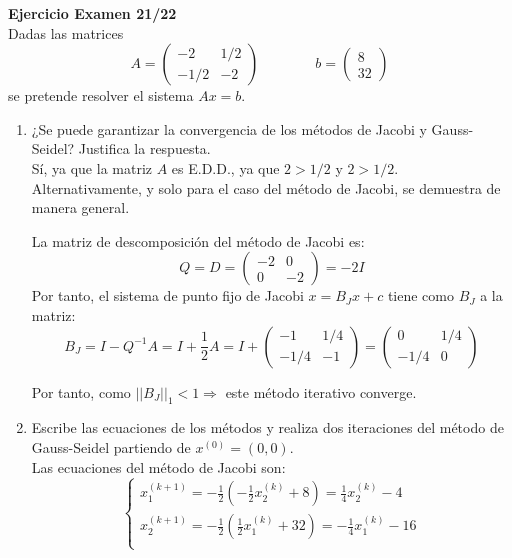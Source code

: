 \begin{ejercicio} \textbf{Ejercicio Examen 21/22}\\
    Dadas las matrices
    $$A=\left( \begin{array}{cc}
        -2 & 1/2 \\
        -1/2 & -2
    \end{array}\right)
    \qquad \qquad
    b=\left( \begin{array}{c}
        8\\32
    \end{array}\right)$$
    se pretende resolver el sistema $Ax=b$.

    \begin{enumerate}
        \item ¿Se puede garantizar la convergencia de los métodos de Jacobi y Gauss-Seidel? Justifica la respuesta.\\
        
        Sí, ya que la matriz $A$ es E.D.D., ya que $2>1/2$ y $2>1/2$.\\

        Alternativamente, y solo para el caso del método de Jacobi, se demuestra de manera general.
        
        La matriz de descomposición del método de Jacobi es:
        $$Q=D=\left( \begin{array}{cc}
            -2 & 0 \\
            0 & -2
        \end{array}\right) = -2I$$
        Por tanto, el sistema de punto fijo de Jacobi $x=B_J x + c$  tiene como $B_J$ a la matriz:
        $$B_J = I-Q^{-1}A = I+\frac{1}{2}A=I + \left( \begin{array}{cc}
            -1 & 1/4 \\
            -1/4 & -1
        \end{array}\right)
        = \left( \begin{array}{cc}
            0 & 1/4 \\
            -1/4 & 0
        \end{array}\right)$$

        Por tanto, como $||B_J||_1 < 1 \Longrightarrow $ este método iterativo converge.

        \item Escribe las ecuaciones de los métodos y realiza dos iteraciones del método de Gauss-Seidel partiendo de $x^{(0)}=(0,0)$.\\

        Las ecuaciones del método de Jacobi son:
        \begin{equation*}
            \left\{\begin{array}{l}
                x_1^{(k+1)} = -\frac{1}{2}\left( -\frac{1}{2}x_2^{(k)} + 8 \right) = \frac{1}{4}x_2^{(k)} - 4 \\
                x_2^{(k+1)} = -\frac{1}{2}\left( \frac{1}{2}x_1^{(k)} + 32 \right) =  -\frac{1}{4}x_1^{(k)} - 16\\
            \end{array} \right.
        \end{equation*}
        

\end{enumerate}
\end{ejercicio}
